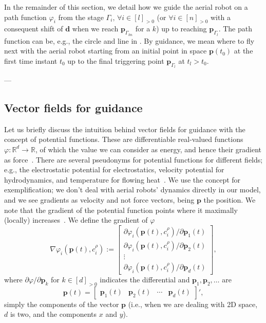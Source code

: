 In the remainder of this section, we detail how we guide the aerial robot on a path function $\varphi_i$ from the stage $\Gamma_i,\,\forall i\in[l]_{>0}$ (or $\forall i\in[n]_{>0}$ with a consequent shift of $\mathbf{d}$ when we reach $\mathbf{p}_{\Gamma_{kn}}$ for a $k$) up to reaching $\mathbf{p}_{\Gamma_l}$. The path function can be, e.g., the circle and line in . By guidance, we mean where to fly next with the aerial robot starting from an initial point in space $\mathbf{p}(t_0)$ at the first time instant $t_0$ up to the final triggering point $\mathbf{p}_{\Gamma_l}$ at $t_l>t_0$.

---

\subsection{Vector fields for guidance}

Let us briefly discuss the intuition behind vector fields for guidance with the concept of potential functions. These are differentiable real-valued functions $\varphi:\mathbb{R}^d\rightarrow\mathbb{R}$, of which the value we can consider as energy, and hence their gradient as force~\citep{choset2005principles}. There are several pseudonyms for potential functions for different fields; e.g., the electrostatic potential for electrostatics, velocity potential for hydrodynamics, and temperature for flowing heat~\citep{needham1998visual}. We use the concept for exemplification; we don't deal with aerial robots' dynamics directly in our model, and we see gradients as velocity and not force vectors, being $\mathbf{p}$ the position. We note that the gradient of the potential function points where it maximally (locally) increases~\citep{choset2005principles}. We define the gradient of $\varphi$
\begin{equation}\label{eq:grady}
  \nabla\varphi_i(\mathbf{p}(t),c^\rho_i):=\begin{bmatrix}\partial\varphi_i(\mathbf{p}(t),c^\rho_i)/\partial\mathbf{p}_1(t)\\\partial\varphi_i(\mathbf{p}(t),c^\rho_i)/\partial\mathbf{p}_2(t)\\\vdots\\\partial\varphi_i(\mathbf{p}(t),c^\rho_i)/\partial\mathbf{p}_d(t)\end{bmatrix},
\end{equation}
where $\partial\varphi/\partial\mathbf{p}_k$ for $k\in[d]_{>0}$ indicates the differential and $\mathbf{p}_1,\mathbf{p}_2,\dots$ are 
\begin{equation}
  \mathbf{p}(t)=\begin{bmatrix}
    \mathbf{p}_1(t) & \mathbf{p}_2(t) & \cdots & \mathbf{p}_d(t)
  \end{bmatrix}',
\end{equation}
simply the components of the vector $\mathbf{p}$ (i.e., when we are dealing with 2D space, $d$ is two, and the components $x$ and $y$). 

